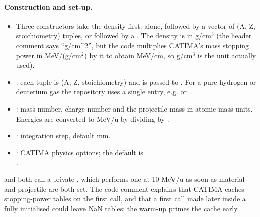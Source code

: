 \paragraph{Construction and set-up.}
\begin{itemize}
\item Three constructors take the density first: alone, followed by a vector of (A, Z, stoichiometry) tuples, or
  followed by a . The density is in g/cm$^3$ (the
  header comment says ``g/cm\^{}2'', but the code multiplies CATIMA's mass stopping power in MeV/(g/cm$^2$) by it to
  obtain MeV/cm, so g/cm$^3$ is the unit actually used).
\item {}: each tuple is (A, Z, stoichiometry) and is passed to
  . For a pure hydrogen or deuterium gas the repository uses a single entry, e.g.
   or .
\item {}: mass number, charge number and the projectile mass
  in atomic mass units. Energies are converted to MeV/u by dividing by .
\item {}: integration step, default  mm.
\item {}: CATIMA physics options; the default is\\ .
\end{itemize}
 and  both call a private , which performs one
 at 10 MeV/u as soon as material and projectile are both set. The code comment explains that
CATIMA caches stopping-power tables on the first call, and that a first call made later inside a fully initialised
 could leave NaN tables; the warm-up primes the cache early.

